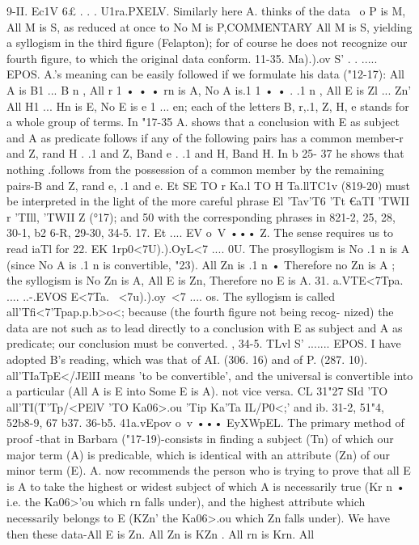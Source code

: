 {{{{{{{{{{{{{{{{{{{9-II. Ec1V 6£ . . . U1ra.PXELV. Similarly here A. thinks of the
data ~o P is M, All M is S, as reduced at once to No M is P,COMMENTARY
All M is S, yielding a syllogism in the third figure (Felapton);
for of course he does not recognize our fourth figure, to which the
original data conform.
11-35. Ma).).ov S' . . ..... EPOS. A.'s meaning can be easily
followed if we formulate his data ("12-17): All A is B1 ... B n ,
All r 1 • • • rn is A, No A is.1 1 • • . .1 n , All E is Zl ... Zn' All
H1 ... Hn is E, No E is e 1 ... en; each of the letters B, r,.1,
Z, H, e stands for a whole group of terms. In "17-35 A. shows
that a conclusion with E as subject and A as predicate follows
if any of the following pairs has a common member-r and Z,
rand H . .1 and Z, Band e . .1 and H, Band H. In b 25- 37 he
shows that nothing .follows from the possession of a common
member by the remaining pairs-B and Z, rand e, .1 and e.
Et SE TO r Ka.l TO H Ta.llTC1v (819-20) must be interpreted in the
light of the more careful phrase El 'Tav'T6 'Tt €aTI 'TWII r 'TIll, 'TWII Z
(°17); and 50 with the corresponding phrases in 821-2, 25, 28,
30-1, b2 6-R, 29-30, 34-5.
17. Et .... EV o~V ••• Z. The sense requires us to read iaTl for
22. EK 1rp0<7U).).OyL<7 .... 0U. The prosyllogism is No .1 n is A (since
No A is .1 n is convertible, "23). All Zn is .1 n • Therefore no Zn
is A ; the syllogism is No Zn is A, All E is Zn, Therefore no E is A.
31. a.VTE<7Tpa. .... ..-.EVOS E<7Ta.~ <7u).).oy~<7 .... os. The syllogism is
called all'Tfi<7'Tpap.p.b>o<; because (the fourth figure not being recog-
nized) the data are not such as to lead directly to a conclusion
with E as subject and A as predicate; our conclusion must be
converted. ,
34-5. TLvl S' ....... EPOS. I have adopted B's reading, which was
that of AI. (306. 16) and of P. (287. 10). all'TIaTpE</JElII means 'to be
convertible', and the universal is convertible into a particular
(All A is E into Some E is A). not vice versa. CL 31"27 SId 'TO
all'TI(T'Tp/<PElV 'TO Ka06>.ou 'Tip Ka'Ta IL/P0<;' and ib. 31-2, 51"4, 52b8-9,
67 b37.
36-b5. 41a.vEpov o~v ••• EyXWpEL. The primary method of proof
-that in Barbara ("17-19)-consists in finding a subject (Tn) of
which our major term (A) is predicable, which is identical with an
attribute (Zn) of our minor term (E). A. now recommends the
person who is trying to prove that all E is A to take the highest or
widest subject of which A is necessarily true (Kr n • i.e. the Ka06>'ou
which rn falls under), and the highest attribute which necessarily
belongs to E (KZn' the Ka06>.ou which Zn falls under). We have
then these data-All E is Zn. All Zn is KZn . All rn is Krn. All
}}}}}}}}}}}}}}}}}}}

